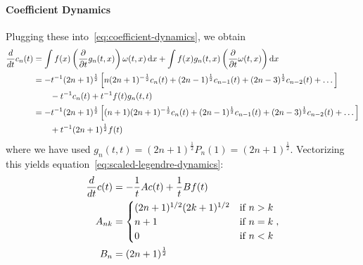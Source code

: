 \documentclass[../../hippo]{subfiles}
\begin{document}
\paragraph{Coefficient Dynamics}

Plugging these into~\eqref{eq:coefficient-dynamics}, we obtain
\begin{align*}
  \frac{d}{dt} c_n(t)
  &= \int f(x) \left( \frac{\partial}{\partial t} g_n(t, x) \right) \omega(t, x) \mathop{}\!\mathrm{d} x
  + \int f(x) g_n(t, x) \left( \frac{\partial}{\partial t} \omega(t, x) \right) \mathop{}\!\mathrm{d} x
  \\
  &= -t^{-1} (2n+1)^{\frac{1}{2}}\left[ n(2n+1)^{-\frac{1}{2}}c_n(t) + (2n-1)^{\frac{1}{2}}c_{n-1}(t) + (2n-3)^{\frac{1}{2}}c_{n-2}(t) + \dots \right]
  \\
  &\qquad - t^{-1} c_n(t) + t^{-1} f(t)g_n(t,t)
  \\
  &= -t^{-1} (2n+1)^{\frac{1}{2}} \left[ (n+1)(2n+1)^{-\frac{1}{2}}c_n(t) + (2n-1)^{\frac{1}{2}} c_{n-1}(t) + (2n-3)^{\frac{1}{2}}c_{n-2}(t) + \dots \right]
  \\
  &\qquad + t^{-1} (2n+1)^{\frac{1}{2}} f(t) 
\end{align*}
where we have used $g_n(t, t) = (2n+1)^{\frac{1}{2}} P_n(1) = (2n+1)^{\frac{1}{2}}$.
Vectorizing this yields equation~\eqref{eq:scaled-legendre-dynamics}:
\begin{align}
  \frac{d}{d t} c(t) &= -\frac{1}{t} A c(t) + \frac{1}{t} B f(t)
  \label{eq:scaled-legendre-dynamics-details}
  \\
  A_{nk}
  &=
  \begin{cases}
    (2n+1)^{1/2}(2k+1)^{1/2} & \mbox{if } n > k \\
    n+1 & \mbox{if } n = k \\
    0 & \mbox{if } n < k
  \end{cases},
  \nonumber \\
  B_n &= (2n+1)^{\frac{1}{2}} \nonumber
\end{align}
\end{document}

